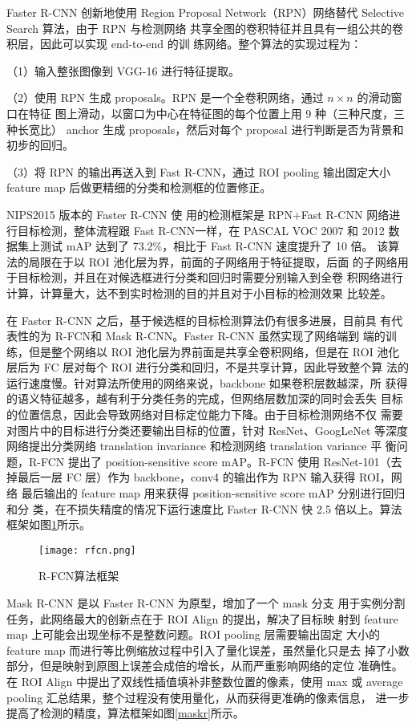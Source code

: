 Faster R-CNN 创新地使用 Region
Proposal Network（RPN）网络替代 Selective Search 算法，由于 RPN 与检测网络
共享全图的卷积特征并且具有一组公共的卷积层，因此可以实现 end-to-end 的训
练网络。整个算法的实现过程为：

（1）输入整张图像到 VGG-16 进行特征提取。

（2）使用 RPN 生成 proposals。RPN 是一个全卷积网络，通过 $n \times n$ 的滑动窗口在特征
图上滑动，以窗口为中心在特征图的每个位置上用 9 种（三种尺度，三种长宽比）
anchor 生成 proposals，然后对每个 proposal 进行判断是否为背景和初步的回归。

（3）将 RPN 的输出再送入到 Fast R-CNN，通过 ROI pooling 输出固定大小 feature
map 后做更精细的分类和检测框的位置修正。

NIPS2015 版本的 Faster R-CNN 使
用的检测框架是 RPN+Fast R-CNN 网络进行目标检测，整体流程跟 Fast R-CNN一样，在 PASCAL VOC 2007 和 2012 数据集上测试 mAP 达到了 73.2$\%$，相比于
Fast R-CNN 速度提升了 10 倍。
该算法的局限在于以 ROI 池化层为界，前面的子网络用于特征提取，后面
的子网络用于目标检测，并且在对候选框进行分类和回归时需要分别输入到全卷
积网络进行计算，计算量大，达不到实时检测的目的并且对于小目标的检测效果
比较差。

在 Faster R-CNN 之后，基于候选框的目标检测算法仍有很多进展，目前具
有代表性的为 R-FCN\cite{dai2016r}和 Mask R-CNN\cite{he2017mask}。Faster R-CNN 虽然实现了网络端到
端的训练，但是整个网络以 ROI 池化层为界前面是共享全卷积网络，但是在 ROI
池化层后为 FC 层对每个 ROI 进行分类和回归，不是共享计算，因此导致整个算
法的运行速度慢。针对算法所使用的网络来说，backbone 如果卷积层数越深，所
获得的语义特征越多，越有利于分类任务的完成，但网络层数加深的同时会丢失
目标的位置信息，因此会导致网络对目标定位能力下降。由于目标检测网络不仅
需要对图片中的目标进行分类还要输出目标的位置，针对 ResNet、GoogLeNet
等深度网络提出分类网络 translation invariance 和检测网络 translation variance 平
衡问题，R-FCN 提出了 position-sensitive score mAP。R-FCN 使用 ResNet-101（去
掉最后一层 FC 层）作为 backbone，conv4 的输出作为 RPN 输入获得 ROI，网络
最后输出的 feature map 用来获得 position-sensitive score mAP 分别进行回归和分
类，在不损失精度的情况下运行速度比 Faster R-CNN 快 2.5 倍以上。算法框架如图\ref{rfcn}所示。

\begin{figure}[htbp]
    \centering
    \texttt{[image: rfcn.png]}
    \caption{R-FCN算法框架}
    \label{rfcn}
\end{figure}

Mask R-CNN 是以 Faster R-CNN 为原型，增加了一个 mask 分支
用于实例分割任务，此网络最大的创新点在于 ROI Align 的提出，解决了目标映
射到 feature map 上可能会出现坐标不是整数问题。ROI pooling 层需要输出固定
大小的 feature map 而进行等比例缩放过程中引入了量化误差，虽然量化只是去
掉了小数部分，但是映射到原图上误差会成倍的增长，从而严重影响网络的定位
准确性。在 ROI Align 中提出了双线性插值填补非整数位置的像素，使用 max 或
average pooling 汇总结果，整个过程没有使用量化，从而获得更准确的像素信息，
进一步提高了检测的精度，算法框架如图\ref{maskr}所示。

